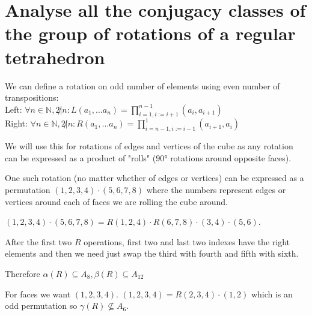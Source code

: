 \documentclass[11pt]{article}
\begin{document}
    \part*{Analyse all the conjugacy classes of the group of rotations of a regular tetrahedron}

    We can define a rotation on odd number of elements using even number of transpositions: \\
    Left: $\forall n \in \mathbb{N}, 2 \not| n: L(a_1, \dots a_n) = \prod\limits_{i = 1, i := i + 1}^{n - 1} (a_{i}, a_{i + 1})$ \\
    Right: $\forall n \in \mathbb{N}, 2 \not| n:R(a_1, \dots a_n) = \prod\limits_{i = n - 1, i := i - 1}^{1} (a_{i + 1}, a_{i})$

    We will use this for rotations of edges and vertices of the cube as any rotation can be expressed as a product of "rolls" ($90°$ rotations around opposite faces).

    One such rotation (no matter whether of edges or vertices) can be expressed as a permutation $(1, 2, 3, 4) \cdot (5, 6, 7, 8)$ where the numbers represent edges or vertices around each of faces we are rolling the cube around.

    $(1, 2, 3, 4) \cdot (5, 6, 7, 8) = R(1, 2, 4) \cdot R(6, 7, 8) \cdot (3, 4) \cdot (5, 6)$.

    After the first two $R$ operations, first two and last two indexes have the right elements and then we need just swap the third with fourth and fifth with sixth.

    Therefore $\alpha(R) \subseteq A_8, \beta(R) \subseteq A_{12}$

    For faces we want $(1, 2, 3, 4)$. $(1, 2, 3, 4) = R(2, 3, 4) \cdot (1, 2)$ which is an odd permutation so $\gamma(R) \not\subseteq A_6$.
\end{document}

